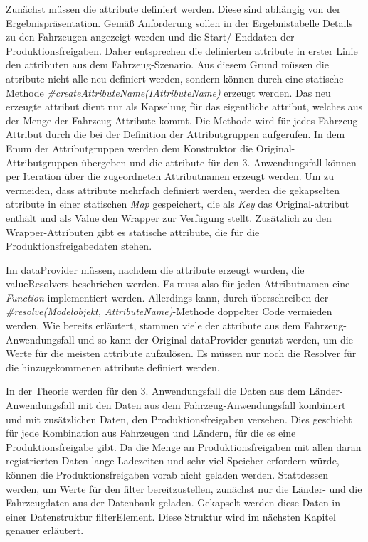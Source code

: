 Zunächst müssen die \gls{attribut}e definiert werden. Diese sind abhängig von der Ergebnispräsentation. Gemäß Anforderung sollen in der Ergebnistabelle Details zu den Fahrzeugen angezeigt werden und die Start/ Enddaten der Produktionsfreigaben. Daher entsprechen die definierten \gls{attribut}e in erster Linie den \gls{attribut}en aus dem Fahrzeug-Szenario. Aus diesem Grund müssen die \gls{attribut}e nicht alle neu definiert werden, sondern können durch eine statische Methode \textit{\#createAttributeName(IAttributeName)} erzeugt werden. Das neu erzeugte \gls{attribut} dient nur als Kapselung für das eigentliche \gls{attribut}, welches aus der Menge der Fahrzeug-Attribute kommt. Die Methode wird für jedes Fahrzeug-Attribut durch die bei der Definition der Attributgruppen aufgerufen. In dem Enum der Attributgruppen werden dem Konstruktor die Original-Attributgruppen übergeben und die \gls{attribut}e für den 3. Anwendungsfall können per Iteration über die zugeordneten Attributnamen erzeugt werden. Um zu vermeiden, dass \gls{attribut}e mehrfach definiert werden, werden die gekapselten \gls{attribut}e in einer statischen \textit{Map} gespeichert, die als \textit{Key} das Original-\gls{attribut} enthält und als Value den Wrapper zur Verfügung stellt. Zusätzlich zu den Wrapper-Attributen gibt es statische \gls{attribut}e, die für die Produktionsfreigabedaten stehen.

Im \gls{dataProvider} müssen, nachdem die \gls{attribut}e erzeugt wurden, die \gls{valueResolver}s beschrieben werden. Es muss also für jeden Attributnamen eine \textit{Function} implementiert werden. Allerdings kann, durch überschreiben der \textit{\#resolve(Modelobjekt, AttributeName)}-Methode doppelter Code vermieden werden. Wie bereits erläutert, stammen viele der \gls{attribut}e aus dem Fahrzeug-Anwendungsfall und so kann der Original-\gls{dataProvider} genutzt werden, um die Werte für die meisten \gls{attribut}e aufzulösen. Es müssen nur noch die Resolver für die hinzugekommenen \gls{attribut}e definiert werden.

In der Theorie werden für den 3. Anwendungsfall die Daten aus dem Länder-An\-wen\-dungs\-fall mit den Daten aus dem Fahrzeug-Anwendungsfall kombiniert und mit zusätzlichen Daten, den Produktionsfreigaben versehen. Dies geschieht für jede Kombination aus Fahrzeugen und Ländern, für die es eine Produktionsfreigabe gibt. Da die Menge an Produktionsfreigaben mit allen daran registrierten Daten lange Ladezeiten und sehr viel Speicher erfordern würde, können die Produktionsfreigaben vorab nicht geladen werden. Stattdessen werden, um Werte für den \gls{filter} bereitzustellen, zunächst nur die Länder- und die Fahrzeugdaten aus der Datenbank geladen. Gekapselt werden diese Daten in einer Datenstruktur \gls{filterElement}. Diese Struktur wird im nächsten Kapitel genauer erläutert.

